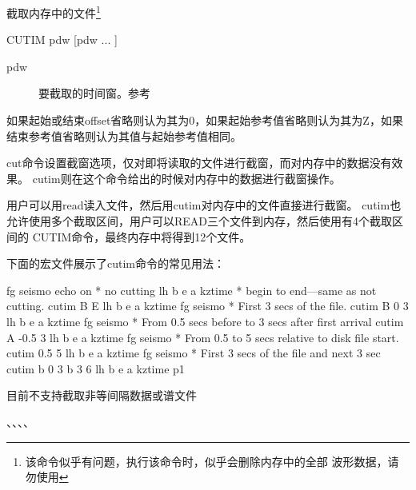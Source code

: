 \label{cmd:cutim}

截取内存中的文件\footnote{该命令似乎有问题，执行该命令时，似乎会删除内存中的全部
波形数据，请勿使用}

\begin{SACSTX}
CUTIM pdw [pdw ... ]
\end{SACSTX}

\begin{description}
\item [pdw] 要截取的时间窗。参考 
\end{description}

如果起始或结束offset省略则认为其为0，如果起始参考值省略则认为其为Z，如果结束参考值省略则认为其值与起始参考值相同。

cut命令设置截窗选项，仅对即将读取的文件进行截窗，而对内存中的数据没有效果。
cutim则在这个命令给出的时候对内存中的数据进行截窗操作。

用户可以用read读入文件，然后用cutim对内存中的文件直接进行截窗。
cutim也允许使用多个截取区间，用户可以READ三个文件到内存，然后使用有4个截取区间的
CUTIM命令，最终内存中将得到12个文件。

下面的宏文件展示了cutim命令的常见用法：
\begin{SACCode}
fg seismo
echo on
* no cutting
lh b e a kztime
* begin to end---same as not cutting.
cutim B E
lh b e a kztime
fg seismo
* First 3 secs of the file.
cutim B 0 3
lh b e a kztime
fg seismo
* From 0.5 secs before to 3 secs after first arrival
cutim A -0.5 3
lh b e a kztime
fg seismo
* From 0.5 to 5 secs relative to disk file start.
cutim 0.5 5
lh b e a kztime
fg seismo
* First 3 secs of the file and next 3 sec
cutim b 0 3 b 3 6
lh b e a kztime
p1
\end{SACCode}

目前不支持截取非等间隔数据或谱文件

、、、、
